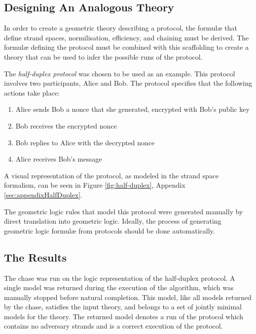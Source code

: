 	\subsection{Designing An Analogous Theory}

		In order to create a geometric theory describing a protocol, the
		formul{\ae} that define strand spaces, normilisation, efficiency, and
		chaining must be derived. The formul{\ae} defining the protocol must be
		combined with this scaffolding to create a theory that can be used to
		infer the possible runs of the protocol.

		The \emph{half-duplex protocol} was chosen to be used as an example.
		This protocol involves two participants, Alice and Bob. The protocol
		specifies that the following actions take place:

		\begin{enumerate}
		\item Alice sends Bob a nonce that she generated, encrypted with Bob's public key
		\item Bob receives the encrypted nonce
		\item Bob replies to Alice with the decrypted nonce
		\item Alice receives Bob's message
		\end{enumerate}

		A visual representation of the protocol, as modeled in the strand space
		formalism, can be seen in Figure \ref{fig:half-duplex}, Appendix
		\ref{sec:appendixHalfDuplex}.

		The geometric logic rules that model this protocol were generated
		manually by direct translation into geometric logic. Ideally, the
		process of generating geometric logic formul{\ae} from protocols should
		be done automatically.

	\subsection{The Results}

		The chase was run on the logic representation of the half-duplex protocol.
		A single model was returned during the execution of the algorithm,
		which was manually stopped before natural completion. This model, like
		all models returned by the chase, satisfies the input theory, and
		belongs to a set of jointly minimal models for the theory. The returned
		model denotes a run of the protocol which contains no adversary strands
		and is a correct execution of the protocol.

